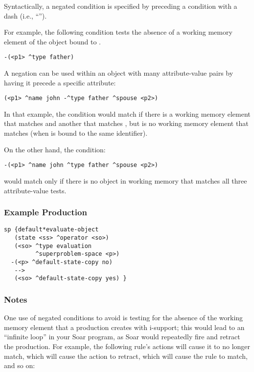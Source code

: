 Syntactically, a negated condition is specified by preceding a condition with a
dash (i.e., ``\soar{-}'').

For example, the following condition tests the absence of a working memory
element of the object bound to .

\begin{verbatim}
-(<p1> ^type father)
\end{verbatim} \vspace{12pt}

A negation can be used within an object with many attribute-value pairs by
having it precede a specific attribute:

\begin{verbatim}
(<p1> ^name john -^type father ^spouse <p2>)
\end{verbatim} \vspace{12pt}

In that example, the condition would match if there is a working memory
element that matches  and another that matches 
, but is no working memory element that matches 
 (when  is bound to the same 
identifier).

On the other hand, the condition:
\begin{verbatim}
-(<p1> ^name john ^type father ^spouse <p2>)
\end{verbatim}

would match only if there is no object in working memory that matches all
three attribute-value tests.

\subsubsection*{Example Production}
\begin{verbatim}
sp {default*evaluate-object
   (state <ss> ^operator <so>)
   (<so> ^type evaluation 
         ^superproblem-space <p>)
  -(<p> ^default-state-copy no)
   -->
   (<so> ^default-state-copy yes) }
\end{verbatim}

\subsubsection*{Notes}

One use of negated conditions to avoid is testing for the absence of the
working memory element that a production creates with i-support; this
would lead to an ``infinite loop'' in your Soar program, as Soar would
repeatedly fire and retract the production. For example, the following rule's
actions will cause it to no longer match, which will cause the action to retract,
which will cause the rule to match, and so on:

